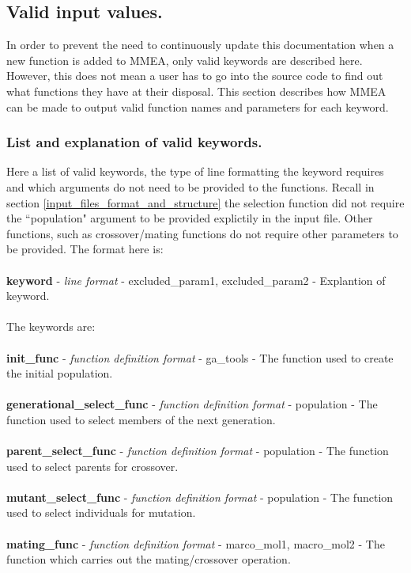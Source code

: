 \documentclass{article}
\begin{document}
\subsection{Valid input values.}
\label{input_files_valid_parameters}
In order to prevent the need to continuously update this documentation when a new function is added to MMEA, only valid keywords are described here. However, this does not mean a user has to go into the source code to find out what functions they have at their disposal. This section describes how MMEA can be made to output valid function names and parameters for each keyword.
\subsubsection{List and explanation of valid keywords.}
\label{list and explanation of valid keywords.}
Here a list of valid keywords, the type of line formatting the keyword requires and which arguments do not need to be provided to the functions. Recall in section \ref{input_files_format_and_structure} the selection function did not require the ``population" argument to be provided explictily in the input file. Other functions, such as crossover/mating functions do not require other parameters to be provided. The format here is:
\\
\\
\textbf{keyword} - \textit{line format} - excluded\_param1, excluded\_param2 - Explantion of keyword.
\\
\\
The keywords are:
\\
\\
\textbf{init\_func} - \textit{function definition format} - ga\_tools - The function used to create the initial population.
\\
\\
\textbf{generational\_select\_func} - \textit{function definition format} - population - The function used to select members of the next generation.
\\
\\
\textbf{parent\_select\_func} - \textit{function definition format} - population - The function used to select parents for crossover.
\\
\\
\textbf{mutant\_select\_func} - \textit{function definition format} - population - The function used to select individuals for mutation.
\\
\\
\textbf{mating\_func} - \textit{function definition format} - marco\_mol1, macro\_mol2 - The function which carries out the mating/crossover operation.
\end{document}
